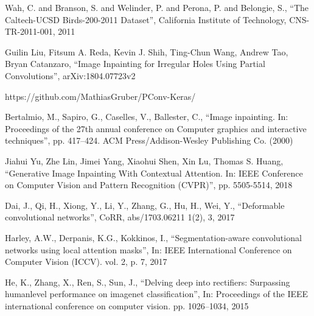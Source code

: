 \documentclass[conference]{IEEEtran}
\begin{document}
\vspace{20px}
\begin{thebibliography}{00}

 Wah, C. and Branson, S. and Welinder, P. and Perona, P. and Belongie, S., ``The Caltech-UCSD Birds-200-2011 Dataset'', California Institute of Technology, CNS-TR-2011-001, 2011

 Guilin Liu, Fitsum A. Reda, Kevin J. Shih, Ting-Chun Wang, Andrew Tao, Bryan Catanzaro, ``Image Inpainting for Irregular Holes Using Partial Convolutions'', arXiv:1804.07723v2  

 https://github.com/MathiasGruber/PConv-Keras/

\bibitem{} Bertalmio, M., Sapiro, G., Caselles, V., Ballester, C., ``Image inpainting. In: Proceedings of the 27th annual conference on Computer graphics and interactive techniques'', pp. 417–424. ACM Press/Addison-Wesley Publishing Co. (2000)  

\bibitem{} Jiahui Yu, Zhe Lin, Jimei Yang, Xiaohui Shen, Xin Lu, Thomas S. Huang, ``Generative Image Inpainting With Contextual Attention. In: IEEE Conference on Computer Vision and Pattern Recognition (CVPR)'', pp. 5505-5514, 2018

\bibitem{} Dai, J., Qi, H., Xiong, Y., Li, Y., Zhang, G., Hu, H., Wei, Y., ``Deformable convolutional networks'', CoRR, abs/1703.06211 1(2), 3, 2017

\bibitem{} Harley, A.W., Derpanis, K.G., Kokkinos, I., ``Segmentation-aware convolutional networks using local attention masks'', In: IEEE International Conference on Computer Vision (ICCV). vol. 2, p. 7, 2017

\bibitem{} He, K., Zhang, X., Ren, S., Sun, J., ``Delving deep into rectifiers: Surpassing humanlevel performance on imagenet classification'', In: Proceedings of the IEEE international conference on computer vision. pp. 1026–1034, 2015

\end{thebibliography}
\end{document}

